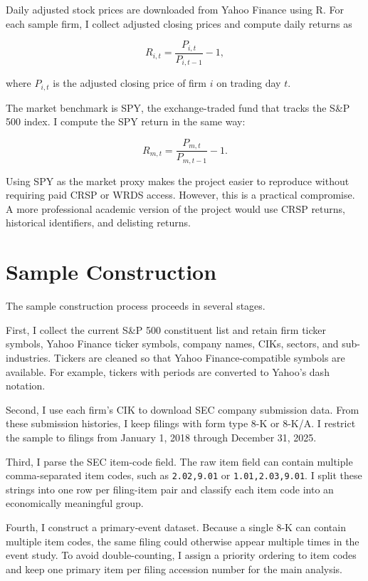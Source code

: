 \documentclass[12pt]{article}
\begin{document}
	Daily adjusted stock prices are downloaded from Yahoo Finance using R. For each sample firm, I collect adjusted closing prices and compute daily returns as
	
	\begin{equation}
		R_{i,t} = \frac{P_{i,t}}{P_{i,t-1}} - 1,
	\end{equation}
	
	where $P_{i,t}$ is the adjusted closing price of firm $i$ on trading day $t$.
	
	The market benchmark is SPY, the exchange-traded fund that tracks the S\&P 500 index. I compute the SPY return in the same way:
	
	\begin{equation}
		R_{m,t} = \frac{P_{m,t}}{P_{m,t-1}} - 1.
	\end{equation}
	
	Using SPY as the market proxy makes the project easier to reproduce without requiring paid CRSP or WRDS access. However, this is a practical compromise. A more professional academic version of the project would use CRSP returns, historical identifiers, and delisting returns.
	
	\section{Sample Construction}
	
	The sample construction process proceeds in several stages.
	
	First, I collect the current S\&P 500 constituent list and retain firm ticker symbols, Yahoo Finance ticker symbols, company names, CIKs, sectors, and sub-industries. Tickers are cleaned so that Yahoo Finance-compatible symbols are available. For example, tickers with periods are converted to Yahoo's dash notation.
	
	Second, I use each firm's CIK to download SEC company submission data. From these submission histories, I keep filings with form type 8-K or 8-K/A. I restrict the sample to filings from January 1, 2018 through December 31, 2025.
	
	Third, I parse the SEC item-code field. The raw item field can contain multiple comma-separated item codes, such as \texttt{2.02,9.01} or \texttt{1.01,2.03,9.01}. I split these strings into one row per filing-item pair and classify each item code into an economically meaningful group.
	
	Fourth, I construct a primary-event dataset. Because a single 8-K can contain multiple item codes, the same filing could otherwise appear multiple times in the event study. To avoid double-counting, I assign a priority ordering to item codes and keep one primary item per filing accession number for the main analysis.
	
\end{document}
